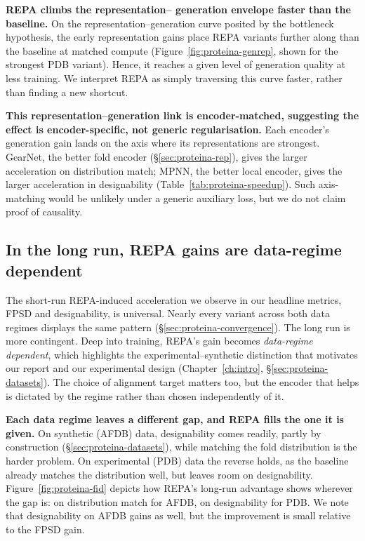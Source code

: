 \documentclass[12pt,a4paper,twoside]{report}
\begin{document}


\textbf{REPA climbs the representation--
generation envelope faster than the baseline.} On the representation--generation curve posited by the bottleneck hypothesis, the early representation gains place REPA variants further along than the baseline at matched compute (Figure~\ref{fig:proteina-genrep}, shown for the strongest PDB variant). Hence, it reaches a given level of generation quality at less training. We interpret REPA as simply traversing this curve faster, rather than finding a new shortcut.



\textbf{This representation--generation link is encoder-matched, suggesting the effect is encoder-specific, not generic regularisation.} Each encoder's generation gain lands on the axis where its representations are strongest. GearNet, the better fold encoder (\S\ref{sec:proteina-rep}), gives the larger acceleration on distribution match; MPNN, the better local encoder, gives the larger acceleration in designability (Table~\ref{tab:proteina-speedup}). Such axis-matching would be unlikely under a generic auxiliary loss, but we do not claim proof of causality.


\subsection{In the long run, REPA gains are data-regime dependent}
\label{sec:proteina-distribution}
\label{sec:proteina-anatomy}
\label{sec:proteina-modulation}

The short-run REPA-induced acceleration we observe in our headline metrics, FPSD and designability, is universal. Nearly every variant across both data regimes displays the same pattern (\S\ref{sec:proteina-convergence}). The long run is more contingent. Deep into training, REPA's gain becomes \emph{data-regime dependent}, which highlights the experimental--synthetic distinction that motivates our report and our experimental design (Chapter~\ref{ch:intro}, \S\ref{sec:proteina-datasets}). The choice of alignment target matters too, but the encoder that helps is dictated by the regime rather than chosen independently of it.

\textbf{Each data regime leaves a different gap, and REPA fills the one it is given.} On synthetic (AFDB) data, designability comes readily, partly by construction (\S\ref{sec:proteina-datasets}), while matching the fold distribution is the harder problem. On experimental (PDB) data the reverse holds, as the baseline already matches the distribution well, but leaves room on designability. Figure~\ref{fig:proteina-fid} depicts how REPA's long-run advantage shows wherever the gap is: on distribution match for AFDB, on designability for PDB. We note that designability on AFDB gains as well, but the improvement is small relative to the FPSD gain.
\end{document}
